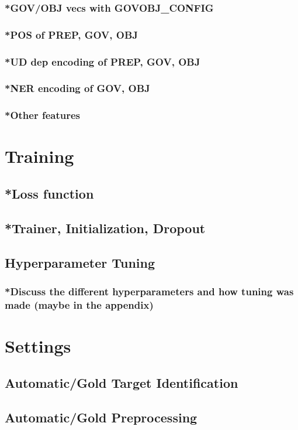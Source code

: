 \subsubsection{*GOV/OBJ vecs with GOVOBJ_CONFIG}
\subsubsection{*POS of PREP, GOV, OBJ}
\subsubsection{*UD dep encoding of PREP, GOV, OBJ}
\subsubsection{*NER encoding of GOV, OBJ}
\subsubsection{*Other features}

\section{Training}
\subsection{*Loss function}
\subsection{*Trainer, Initialization, Dropout}
\subsection{Hyperparameter Tuning}
\subsubsection{*Discuss the different hyperparameters and how tuning was made (maybe in the appendix)}

\section{Settings}
\subsection{Automatic/Gold Target Identification}
\subsection{Automatic/Gold Preprocessing}


